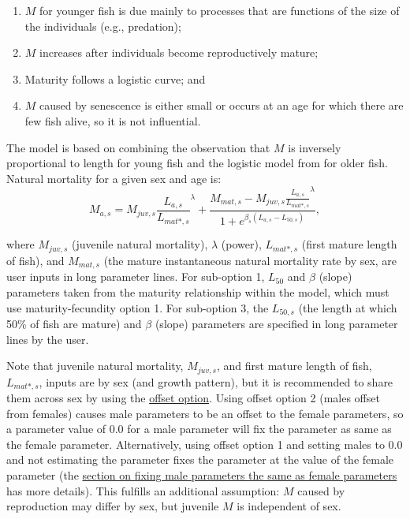 \begin{enumerate}
  \item $M$ for younger fish is due mainly to processes that are functions of the size of the individuals (e.g., predation);
  \item $M$ increases after individuals become reproductively mature;
  \item Maturity follows a logistic curve; and
  \item $M$ caused by senescence is either small or occurs at an age for which there are few fish alive, so it is not influential. 
\end{enumerate}
The model is based on combining the observation that $M$ is inversely proportional to length for young fish \citep{lorenzen2000allometry} and the logistic model from \citet{lehodey2008spatial} for older fish. Natural mortality for a given sex and age is:
\begin{equation}
M_{a,s} = M_{juv,s}\frac{L_{a,s}}{L_{mat*,s}}^{\lambda} + 
\frac{M_{mat,s}-M_{juv,s}\frac{L_{a,s}}{L_{mat*,s}}^{\lambda}}{1+e^{\beta_s(L_{a,s}- L_{50,s})}},
\end{equation}

where $M_{juv,s}$ (juvenile natural mortality), $\lambda$ (power), $L_{mat*,s}$ (first mature length of fish), and $M_{mat,s}$ (the mature instantaneous natural mortality rate by sex, are user inputs in long parameter lines. For sub-option 1, $L_{50}$ and $\beta$ (slope) parameters taken from the maturity relationship within the model, which must use maturity-fecundity option 1. For sub-option 3, the $L_{50,s}$ (the length at which 50\% of fish are mature) and $\beta$ (slope) parameters are specified in long parameter lines by the user.

Note that juvenile natural mortality, $M_{juv,s}$, and first mature length of fish, $L_{mat*,s}$, inputs are by sex (and growth pattern), but it is recommended to share them across sex by using the \hyperlink{offset}{offset option}. Using offset option 2 (males offset from females) causes male parameters to be an offset to the female parameters, so a parameter value of 0.0 for a male parameter will fix the parameter as same as the female parameter. Alternatively, using offset option 1 and setting males to 0.0 and not estimating the parameter fixes the parameter at the value of the female parameter (the \hyperlink{male-shortcut}{section on fixing male parameters the same as female parameters} has more details). This fulfills an additional assumption: $M$ caused by reproduction may differ by sex, but juvenile $M$ is independent of sex.

